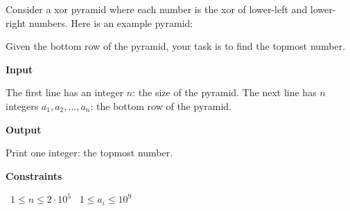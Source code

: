 Consider a xor pyramid where each number is the xor of lower-left and lower-right numbers. Here is an example pyramid:

Given the bottom row of the pyramid, your task is to find the topmost number.

\vspace{0.3cm}\noindent\textbf{Input}

The first line has an integer $n$: the size of the pyramid.
The next line has $n$ integers $a_1,a_2,\dots,a_n$: the bottom row of the pyramid.

\vspace{0.3cm}\noindent\textbf{Output}

Print one integer: the topmost number.

\vspace{0.3cm}\noindent\textbf{Constraints}

\textbullet\ $1 \le n \le 2 \cdot 10^5$
\textbullet\ $1 \le a_i \le 10^9$